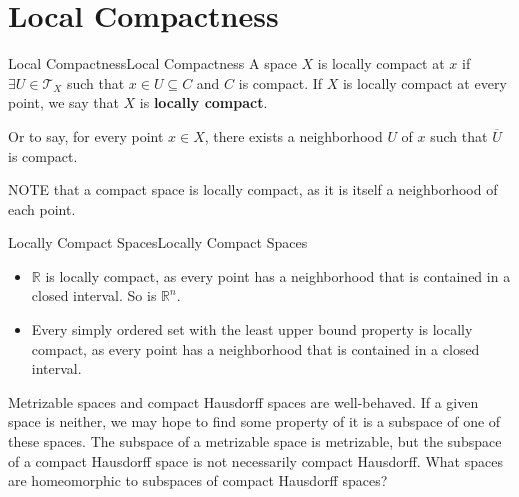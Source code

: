 \documentclass[../main.tex]{subfiles}
\begin{document}
\section{Local Compactness}

\begin{definition}{Local Compactness}{Local Compactness}
	A space $X$ is locally compact at $x$ if $\exists U\in \mathcal{T}_X$ such that $x\in U \subseteq C$ and $C$ is compact. If $X$ is locally compact at every point, we say that $X$ is \textbf{locally compact}.

	Or to say, for every point $x\in X$, there exists a neighborhood $U$ of $x$ such that $\overline{U}$ is compact.
\end{definition}

NOTE that a compact space is locally compact, as it is itself a neighborhood of each point.

\begin{example}{Locally Compact Spaces}{Locally Compact Spaces}
\begin{itemize}
\item $\mathbb{R}$ is locally compact, as every point has a neighborhood that is contained in a closed interval. So is $\mathbb{R}^n$.
\item Every simply ordered set with the least upper bound property is locally compact, as every point has a neighborhood that is contained in a closed interval.
\end{itemize}
\end{example}

Metrizable spaces and compact Hausdorff spaces are well-behaved. If a given space is neither, we may hope to find some property of it is a subspace of one of these spaces. The subspace of a metrizable space is metrizable, but the subspace of a compact Hausdorff space is not necessarily compact Hausdorff. What spaces are homeomorphic to subspaces of compact Hausdorff spaces?
\end{document}
